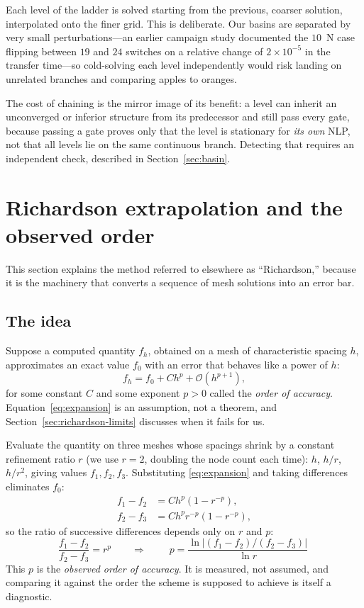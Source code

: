 \documentclass[11pt]{article}
\begin{document}
Each level of the ladder is solved starting from the previous, coarser
solution, interpolated onto the finer grid. This is deliberate. Our basins are
separated by very small perturbations---an earlier campaign study documented
the $10$~N case flipping between $19$ and $24$ switches on a relative change of
$2\times10^{-5}$ in the transfer time---so cold-solving each level
independently would risk landing on unrelated branches and comparing apples to
oranges.

The cost of chaining is the mirror image of its benefit: a level can inherit an
unconverged or inferior structure from its predecessor and still pass every
gate, because passing a gate proves only that the level is stationary for
\emph{its own} NLP, not that all levels lie on the same continuous branch.
Detecting that requires an independent check, described in
Section~\ref{sec:basin}.

\section{Richardson extrapolation and the observed order}
\label{sec:richardson}

This section explains the method referred to elsewhere as ``Richardson,''
because it is the machinery that converts a sequence of mesh solutions into an
error bar.

\subsection{The idea}

Suppose a computed quantity $f_h$, obtained on a mesh of characteristic
spacing $h$, approximates an exact value $f_0$ with an error that behaves like
a power of $h$:
\begin{equation}
  f_h = f_0 + C h^p + \mathcal{O}(h^{p+1}),
  \label{eq:expansion}
\end{equation}
for some constant $C$ and some exponent $p > 0$ called the \emph{order of
accuracy}. Equation~\eqref{eq:expansion} is an assumption, not a theorem, and
Section~\ref{sec:richardson-limits} discusses when it fails for us.

Evaluate the quantity on three meshes whose spacings shrink by a constant
refinement ratio $r$ (we use $r=2$, doubling the node count each time):
$h$, $h/r$, $h/r^2$, giving values $f_1, f_2, f_3$. Substituting
\eqref{eq:expansion} and taking differences eliminates $f_0$:
\begin{align}
  f_1 - f_2 &= C h^p \left( 1 - r^{-p} \right), \\
  f_2 - f_3 &= C h^p r^{-p} \left( 1 - r^{-p} \right),
\end{align}
so the ratio of successive differences depends only on $r$ and $p$:
\begin{equation}
  \frac{f_1 - f_2}{f_2 - f_3} = r^{p}
  \qquad\Longrightarrow\qquad
  \boxed{\;p = \frac{\ln\!\left| (f_1-f_2)/(f_2-f_3) \right|}{\ln r}\;}
  \label{eq:order}
\end{equation}
This $p$ is the \emph{observed order of accuracy}. It is measured, not assumed,
and comparing it against the order the scheme is supposed to achieve is itself
a diagnostic.
\end{document}
